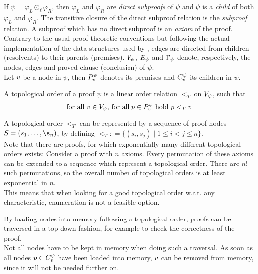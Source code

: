 \documentclass{llncs}
\newcommand{\defeq}{\mathrel{\mathop:}=}
\begin{document}
\noindent
If $\psi = \varphi_L \odot_{\ell} \varphi_R$, then $\varphi_L$ and $\varphi_R$ are \emph{direct
subproofs} of $\psi$ and $\psi$ is a \emph{child} of both $\varphi_L$ and $\varphi_R$. The
transitive closure of the direct subproof relation is the \emph{subproof} relation. A subproof which
has no direct subproof is an \emph{axiom} of the proof. 
Contrary to the usual proof
theoretic conventions but following the actual implementation of the data structures used by
\PebblingAlgorithms, edges are directed from children (resolvents) to their parents (premises).
%
$V_{\psi}$, $E_{\psi}$ and $\Gamma_{\psi}$
denote, respectively, the nodes, edges and proved clause (conclusion) of $\psi$.\\
Let $v$ be a node in $\psi$, then $P_{v}^{\psi}$ denotes its premises and $C_{v}^{\psi}$ its children in $\psi$.

\begin{definition}
\label{def:topological order}
A topological order of a proof $\psi$ is a linear order relation $<_T$ on $V_{\psi}$, such that 
$$
\text{for all } v \in V_{\psi} \text{, for all } p \in P_{v}^{\psi} \text{ hold }\\
p <_T v
$$
\end{definition}
A topological order $<_T$ can be represented by a sequence of proof nodes $S = (s_1,\ldots,\s_n)$, by defining $<_T \defeq \{(s_i,s_j) \mid 1 \leq i < j \leq n\}$.\\
Note that there are proofs, for which exponentially many different topological orders exists: Consider a proof with $n$ axioms. Every permutation of these axioms can be extended to a sequence which represent a topological order. There are $n!$ such permutations, so the overall number of topological orders is at least exponential in $n$.\\
This means that when looking for a good topological order w.r.t. any characteristic, enumeration is not a feasible option.

By loading nodes into memory following a topological order, proofs can be traversed in a top-down fashion, for example to check the correctness of the proof.\\
Not all nodes have to be kept in memory when doing such a traversal. As soon as all nodes $p \in C_{v}^{\psi}$ have been loaded into memory, $v$ can be removed from memory,
since it will not be needed further on.
\end{document}
